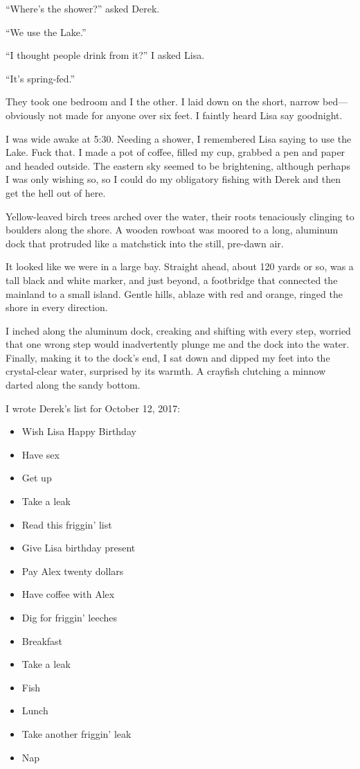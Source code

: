 ``Where's the shower?'' asked Derek.

``We use the Lake.''

``I thought people drink from it?'' I asked Lisa.

``It's spring-fed.''

They took one bedroom and I the other. I laid down on the short, narrow
bed---obviously not made for anyone over six feet. I faintly heard Lisa
say goodnight.

I was wide awake at 5:30. Needing a shower, I remembered Lisa saying to
use the Lake. Fuck that. I made a pot of coffee, filled my cup, grabbed
a pen and paper and headed outside. The eastern sky seemed to be
brightening, although perhaps I was only wishing so, so I could do my
obligatory fishing with Derek and then get the hell out of here.

Yellow-leaved birch trees arched over the water, their roots tenaciously
clinging to boulders along the shore. A wooden rowboat was moored to a
long, aluminum dock that protruded like a matchstick into the still,
pre-dawn air.

It looked like we were in a large bay. Straight ahead, about 120 yards
or so, was a tall black and white marker, and just beyond, a footbridge
that connected the mainland to a small island. Gentle hills, ablaze with
red and orange, ringed the shore in every direction.

I inched along the aluminum dock, creaking and shifting with every step,
worried that one wrong step would inadvertently plunge me and the dock
into the water. Finally, making it to the dock's end, I sat down and
dipped my feet into the crystal-clear water, surprised by its warmth. A
crayfish clutching a minnow darted along the sandy bottom.

I wrote Derek's list for October 12, 2017:

\begin{itemize}
\tightlist
\item
  Wish Lisa Happy Birthday
\item
  Have sex
\item
  Get up
\item
  Take a leak
\item
  Read this friggin' list
\item
  Give Lisa birthday present
\item
  Pay Alex twenty dollars
\item
  Have coffee with Alex
\item
  Dig for friggin' leeches
\item
  Breakfast
\item
  Take a leak
\item
  Fish
\item
  Lunch
\item
  Take another friggin' leak
\item
  Nap
\end{itemize}

